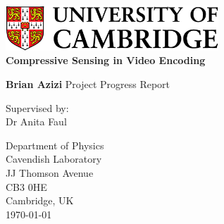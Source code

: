 \documentclass[final,3p,times,twocolumn]{report}
\begin{document}



\begin{titlepage}
\begin{center}
\includegraphics[width=0.6\textwidth]{cam.png}\\

\vspace*{4cm}
\Huge\textbf{Compressive Sensing in Video Encoding}

\vspace*{1.5cm}
\LARGE
\textbf{Brian Azizi}
\vfill
Project Progress Report

\vspace{0.8cm}

\normalsize
Supervised by:\\
Dr Anita Faul

\vspace{0.2cm}
Department of Physics\\
Cavendish Laboratory\\
JJ Thomson Avenue\\
CB3 0HE\\
Cambridge, UK\\
\vspace{0.4cm}
\normalsize
\today

\end{center}
\end{titlepage}
\end{document}
